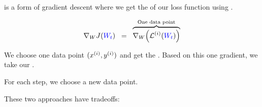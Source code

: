             \begin{definition}
                 is a form of gradient descent where we get the  of our loss function using .
                
                \begin{equation*}
                    \nabla_W J ( \textcolor{blue}{ W_t } )
                    \;\;
                    =
                    \;\;
                    \overbrace{
                    \nabla_W
                    \Big(
                        \mathcal{L}^{(i)}(\textcolor{blue}{ W_t })
                    \Big)
                    }^{\text{One data point}}
                \end{equation*}
                
                We  choose one data point $(x^{(i)},y^{(i)})$ and get the . Based on this one gradient, we take our .
                
                For each step, we choose a new  data point.
            \end{definition}
            
            These two approaches have tradeoffs:\\
            
